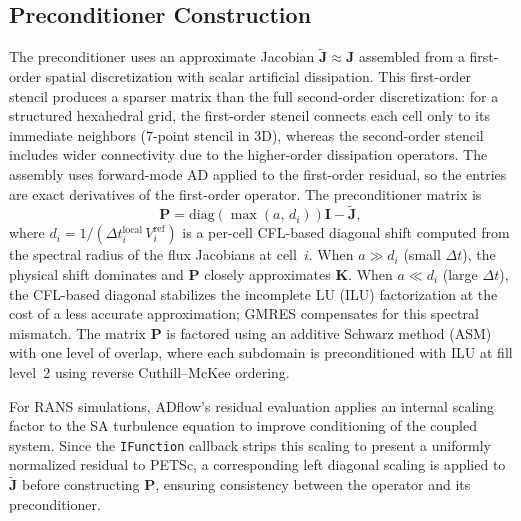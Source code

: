 \documentclass[journal]{new-aiaa}
\newcommand{\mb}[1]{\mathbf{#1}}
\begin{document}
\subsection{Preconditioner Construction}\label{sec:preconditioner}
The preconditioner uses an approximate Jacobian $\tilde{\mb{J}} \approx \mb{J}$ assembled from a first-order spatial discretization with scalar artificial dissipation.
This first-order stencil produces a sparser matrix than the full second-order discretization: for a structured hexahedral grid, the first-order stencil connects each cell only to its immediate neighbors (7-point stencil in 3D), whereas the second-order stencil includes wider connectivity due to the higher-order dissipation operators.
The assembly uses forward-mode AD applied to the first-order residual, so the entries are exact derivatives of the first-order operator.
The preconditioner matrix is
\begin{equation}\label{eq:pc_matrix}
\mb{P} = \text{diag}\!\left(\max(a, \, d_i)\right) \mb{I} - \tilde{\mb{J}},
\end{equation}
where $d_i = 1/(\Delta t_i^{\text{local}} \, V_i^{\text{ref}})$ is a per-cell CFL-based diagonal shift computed from the spectral radius of the flux Jacobians at cell~$i$.
When $a \gg d_i$ (small $\Delta t$), the physical shift dominates and $\mb{P}$ closely approximates $\mb{K}$.
When $a \ll d_i$ (large $\Delta t$), the CFL-based diagonal stabilizes the incomplete LU (ILU) factorization at the cost of a less accurate approximation; GMRES compensates for this spectral mismatch.
The matrix $\mb{P}$ is factored using an additive Schwarz method (ASM) with one level of overlap, where each subdomain is preconditioned with ILU at fill level~2 using reverse Cuthill--McKee ordering.

For RANS simulations, ADflow's residual evaluation applies an internal scaling factor to the SA turbulence equation to improve conditioning of the coupled system.
Since the \texttt{IFunction} callback strips this scaling to present a uniformly normalized residual to PETSc, a corresponding left diagonal scaling is applied to $\tilde{\mb{J}}$ before constructing $\mb{P}$, ensuring consistency between the operator and its preconditioner.
\end{document}
